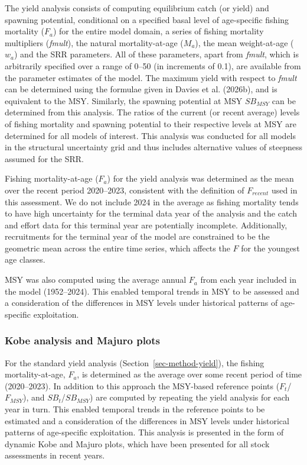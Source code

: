 \documentclass[
  english,
  a4paper,
  a4paper,
  11pt]{SCreport}
\begin{document}
The yield analysis consists of computing equilibrium catch (or yield)
and spawning potential, conditional on a specified basal level of
age-specific fishing mortality (\(F_a\)) for the entire model domain, a
series of fishing mortality multipliers (\emph{fmult}), the natural
mortality-at-age (\(M_a\)), the mean weight-at-age (\(w_a\)) and the SRR
parameters. All of these parameters, apart from \emph{fmult}, which is
arbitrarily specified over a range of 0--50 (in increments of 0.1), are
available from the parameter estimates of the model. The maximum yield
with respect to \emph{fmult} can be determined using the formulae given
in Davies et al. (2026b), and is equivalent to the MSY. Similarly, the
spawning potential at MSY \(SB_{MSY}\) can be determined from this
analysis. The ratios of the current (or recent average) levels of
fishing mortality and spawning potential to their respective levels at
MSY are determined for all models of interest. This analysis was
conducted for all models in the structural uncertainty grid and thus
includes alternative values of steepness assumed for the SRR.

Fishing mortality-at-age (\(F_a\)) for the yield analysis was determined
as the mean over the recent period 2020--2023, consistent with the
definition of \(F_{recent}\) used in this assessment. We do not include
2024 in the average as fishing mortality tends to have high uncertainty
for the terminal data year of the analysis and the catch and effort data
for this terminal year are potentially incomplete. Additionally,
recruitments for the terminal year of the model are constrained to be
the geometric mean across the entire time series, which affects the
\(F\) for the youngest age classes.

MSY was also computed using the average annual \(F_a\) from each year
included in the model (1952--2024). This enabled temporal trends in MSY
to be assessed and a consideration of the differences in MSY levels
under historical patterns of age-specific exploitation.

\subsubsection{Kobe analysis and Majuro plots}\label{sec-method-kobe}

For the standard yield analysis (Section~\ref{sec-method-yield}), the
fishing mortality-at-age, \(F_a\), is determined as the average over
some recent period of time (2020--2023). In addition to this approach
the MSY-based reference points (\(F_t\)/\(F_{MSY}\)), and
\(SB_t\)/\(SB_{MSY}\)) are computed by repeating the yield analysis for
each year in turn. This enabled temporal trends in the reference points
to be estimated and a consideration of the differences in MSY levels
under historical patterns of age-specific exploitation. This analysis is
presented in the form of dynamic Kobe and Majuro plots, which have been
presented for all stock assessments in recent years.
\end{document}

